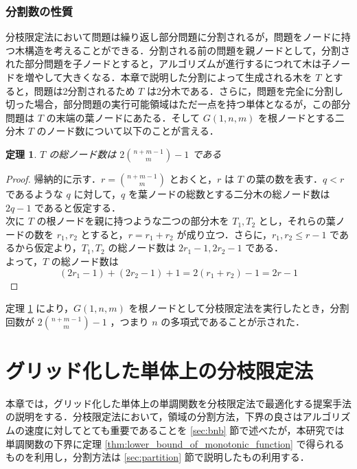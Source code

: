 \documentclass[a4paper,11pt]{jreport}
\newtheorem{theorem}{定理}
\begin{document}
\subsection{分割数の性質} \label{sec:number_of_partition}

分枝限定法において問題は繰り返し部分問題に分割されるが，問題をノードに持つ木構造を考えることができる．分割される前の問題を親ノードとして，分割された部分問題を子ノードとすると，アルゴリズムが進行するにつれて木は子ノードを増やして大きくなる．本章で説明した分割によって生成される木を $ T $ とすると，問題は2分割されるため $ T $ は2分木である．さらに，問題を完全に分割し切った場合，部分問題の実行可能領域はただ一点を持つ単体となるが，この部分問題は $ T $ の末端の葉ノードにあたる．そして $ G(1, n, m) $ を根ノードとする二分木 $ T $ のノード数について以下のことが言える．

\begin{theorem} \label{thm:total_node}
$ T $ の総ノード数は $ 2 \binom{n + m - 1}{m} - 1 $ である
\end{theorem}
\begin{proof}
帰納的に示す．$ r = \binom{n + m - 1}{m} $ とおくと，$ r $ は $ T $ の葉の数を表す．$ q < r $ であるような $ q $ に対して，$ q $ を葉ノードの総数とする二分木の総ノード数は $ 2q - 1 $ であると仮定する．\\
次に $ T $ の根ノードを親に持つような二つの部分木を $ T_1, T_2 $ とし，それらの葉ノードの数を $ r_1, r_2 $ とすると，$ r = r_1 + r_2 $ が成り立つ．さらに，$ r_1, r_2 \leq r - 1 $ であるから仮定より，$ T_1, T_2 $ の総ノード数は $ 2r_1 - 1, 2r_2 - 1 $ である．\\
よって，$ T $ の総ノード数は
$$ (2r_1 - 1) + (2r_2 - 1) + 1 = 2(r_1 + r_2) - 1 = 2r - 1 $$
\end{proof}

定理 \ref{thm:total_node} により，$ G(1, n, m) $ を根ノードとして分枝限定法を実行したとき，分割回数が $ 2 \binom{n + m - 1}{m} - 1 $ ，つまり $ n $ の多項式であることが示された．

\chapter{グリッド化した単体上の分枝限定法}

本章では，グリッド化した単体上の単調関数を分枝限定法で最適化する提案手法の説明をする．分枝限定法において，領域の分割方法，下界の良さはアルゴリズムの速度に対してとても重要であることを \ref{sec:bnb} 節で述べたが，本研究では単調関数の下界に定理  \ref{thm:lower_bound_of_monotonic_function} で得られるものを利用し，分割方法は \ref{sec:partition} 節で説明したもの利用する．\par
\end{document}
